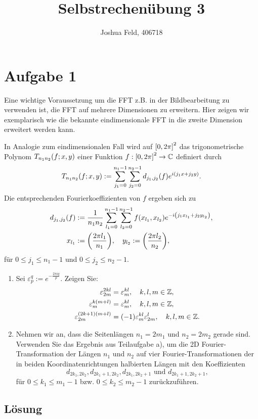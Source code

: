 \documentclass{exercise}
\institute{Applied and Computational Mathematics}
\title{Selbstrechenübung 3}
\author{Joshua Feld, 406718}
\begin{document}
    \maketitle


    \section*{Aufgabe 1}

    \begin{problem}
        Eine wichtige Voraussetzung um die FFT z.B. in der Bildbearbeitung zu verwenden ist, die FFT auf mehrere Dimensionen zu erweitern.
        Hier zeigen wir exemplarisch wie die bekannte eindimensionale FFT in die zweite Dimension erweitert werden kann.

        In Analogie zum eindimensionalen Fall wird auf \(\brackets*{0, 2\pi}^2\) das trigonometrische Polynom \(T_{n_1 n_2}\parentheses*{f; x, y}\) einer Funktion \(f: \brackets*{0, 2\pi}^2 \to \C\) definiert durch
        \[
            T_{n_1 n_2}\parentheses*{f; x, y} := \sum_{j_1 = 0}^{n_1 - 1}\sum_{j_2 = 0}^{n_2 - 1}d_{j_1, j_2}\parentheses*{f}e^{i\parentheses*{j_1 x + j_2 y}}.
        \]
        Die entsprechenden Fourierkoeffizienten von \(f\) ergeben sich zu
        \begin{align*}
            d_{j_1, j_2}\parentheses*{f} &:= \frac{1}{n_1 n_2}\sum_{l_1 = 0}^{n_1 - 1}\sum_{l_2 = 0}^{n_2 - 1}f\parentheses*{x_{l_1}, x_{l_2}}e^{-i\parentheses*{j_1 x_{l_1} + j_2 y_{l_2}}},\\
            x_{l_1} &:= \parentheses*{\frac{2\pi l_1}{n_1}}, \quad y_{l_2} := \parentheses*{\frac{2\pi l_2}{n_2}},
        \end{align*}
        für \(0 \le j_1 \le n_1 - 1\) und \(0 \le j_2 \le n_2 - 1\).
        \begin{enumerate}
            \item Sei \(\varepsilon_p^q := e^{-\frac{2\pi iq}{p}}\).
            Zeigen Sie:
            \begin{align*}
                \varepsilon_{2m}^{2kl} &= \varepsilon_m^{kl}, \quad k, l, m \in \Z,\\
                \varepsilon_m^{k\parentheses*{m + l}} &= \varepsilon_m^{kl}, \quad k, l, m \in \Z,\\
                \varepsilon_{2m}^{\parentheses*{2k + 1}\parentheses*{m + l}} &= \parentheses*{-1}\varepsilon_m^{kl}\varepsilon_{2m}^l, \quad k, l, m \in \Z.
            \end{align*}
            \item Nehmen wir an, dass die Seitenlängen \(n_1 = 2m_1\) und \(n_2 = 2m_2\) gerade sind.
            Verwenden Sie das Ergebnis aus Teilaufgabe a), um die 2D Fourier-Transformation der Längen \(n_1\) und \(n_2\) auf vier Fourier-Transformationen der in beiden Koordinatenrichtungen halbierten Längen mit den Koeffizienten
            \[
                d_{2k_1, 2k_2}, d_{2k_1 + 1, 2k_2}, d_{2k_1, 2k_2 + 1}\text{ und }d_{2k_1 + 1, 2k_2 + 1},
            \]
            für \(0 \le k_1 \le m_1 - 1\) bzw. \(0 \le k_2 \le m_2 - 1\) zurückzuführen.
        \end{enumerate}
    \end{problem}

    \subsection*{Lösung}
\end{document}

